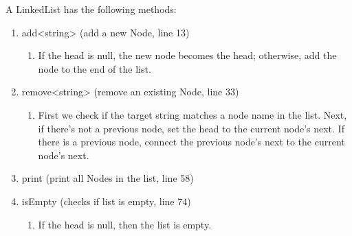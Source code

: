 \documentclass[letterpaper, 10pt,DIV=13]{scrartcl}
\numberwithin{equation}{section} %
\numberwithin{figure}{section} %
\numberwithin{table}{section} %
\begin{document}
A LinkedList  has the following methods: 
\begin{enumerate}
    \item add<string> (add a new Node, line 13) 
        \begin{enumerate}
            \item If the head is null, the new node becomes the head; otherwise, add the node to the end of the list.
        \end{enumerate}
    \item remove<string> (remove an existing Node, line 33)
        \begin{enumerate}
            \item First we check if the target string matches a node name in the list. Next, if there's not a previous node, set the head to the current node's next. If there is a previous node, connect the previous node's next to the current node's next.
        \end{enumerate}
    \item print (print all Nodes in the list, line 58)
    \item isEmpty (checks if list is empty, line 74)
        \begin{enumerate}
            \item If the head is null, then the list is empty.
        \end{enumerate}
\end{enumerate}
\end{document}
